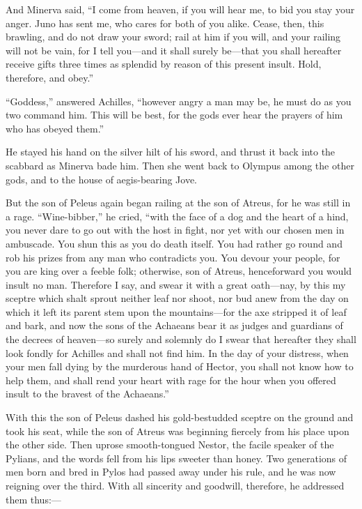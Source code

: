 And Minerva said, “I come from heaven, if you will hear me, to bid you
stay your anger. Juno has sent me, who cares for both of you alike. Cease,
then, this brawling, and do not draw your sword; rail at him if you will,
and your railing will not be vain, for I tell you—and it shall
surely be—that you shall hereafter receive gifts three times as
splendid by reason of this present insult. Hold, therefore, and obey.”

“Goddess,” answered Achilles, “however angry a man may be, he must do as
you two command him. This will be best, for the gods ever hear the prayers
of him who has obeyed them.”

He stayed his hand on the silver hilt of his sword, and thrust it back
into the scabbard as Minerva bade him. Then she went back to Olympus among
the other gods, and to the house of aegis-bearing Jove.

But the son of Peleus again began railing at the son of Atreus, for he was
still in a rage. “Wine-bibber,” he cried, “with the face of a dog and the
heart of a hind, you never dare to go out with the host in fight, nor yet
with our chosen men in ambuscade. You shun this as you do death itself.
You had rather go round and rob his prizes from any man who contradicts
you. You devour your people, for you are king over a feeble folk;
otherwise, son of Atreus, henceforward you would insult no man. Therefore
I say, and swear it with a great oath—nay, by this my sceptre which
shalt sprout neither leaf nor shoot, nor bud anew from the day on which it
left its parent stem upon the mountains—for the axe stripped it of
leaf and bark, and now the sons of the Achaeans bear it as judges and
guardians of the decrees of heaven—so surely and solemnly do I swear
that hereafter they shall look fondly for Achilles and shall not find him.
In the day of your distress, when your men fall dying by the murderous
hand of Hector, you shall not know how to help them, and shall rend your
heart with rage for the hour when you offered insult to the bravest of the
Achaeans.”

With this the son of Peleus dashed his gold-bestudded sceptre on the
ground and took his seat, while the son of Atreus was beginning fiercely
from his place upon the other side. Then uprose smooth-tongued Nestor, the
facile speaker of the Pylians, and the words fell from his lips sweeter
than honey. Two generations of men born and bred in Pylos had passed away
under his rule, and he was now reigning over the third. With all sincerity
and goodwill, therefore, he addressed them thus:—

